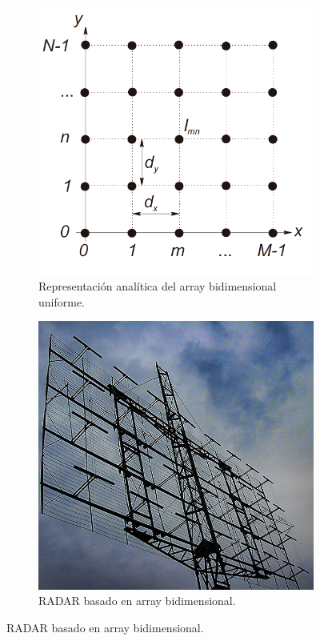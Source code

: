 \begin{figure}[h]
     \centering
     \begin{subfigure}[b]{0.45\textwidth}
         \centering
         \includegraphics[width=\textwidth]{archivos/array/bidimensional}
         \caption{Representación analítica del array bidimensional uniforme. \cite{Cardama2002}}
         \label{fig:bidimensionalfoto}
     \end{subfigure}
     \hfill
     \begin{subfigure}[b]{0.45\textwidth}
         \centering
         \includegraphics[width=\textwidth]{archivos/array/fotoarray}
         \caption{RADAR basado en array bidimensional. \cite{brewbooks2008} }
         \label{fig:radarfoto}
     \end{subfigure}
     \hfill
\end{figure}

